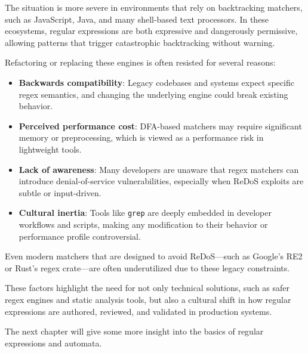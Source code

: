 The situation is more severe in environments that rely on backtracking matchers, such as JavaScript, Java, and many shell-based text processors. In these ecosystems, regular expressions are both expressive and dangerously permissive, allowing patterns that trigger catastrophic backtracking without warning.

Refactoring or replacing these engines is often resisted for several reasons:
\begin{itemize}
	\item \textbf{Backwards compatibility}: Legacy codebases and systems expect specific regex semantics, and changing the underlying engine could break existing behavior.
	\item \textbf{Perceived performance cost}: DFA-based matchers may require significant memory or preprocessing, which is viewed as a performance risk in lightweight tools.
	\item \textbf{Lack of awareness}: Many developers are unaware that regex matchers can introduce denial-of-service vulnerabilities, especially when ReDoS exploits are subtle or input-driven.
	\item \textbf{Cultural inertia}: Tools like \texttt{grep} are deeply embedded in developer workflows and scripts, making any modification to their behavior or performance profile controversial.
\end{itemize}

Even modern matchers that are designed to avoid ReDoS—such as Google’s RE2 or Rust’s regex crate—are often underutilized due to these legacy constraints.

These factors highlight the need for not only technical solutions, such as safer regex engines and static analysis tools, but also a cultural shift in how regular expressions are authored, reviewed, and validated in production systems.

The next chapter will give some more insight into the basics of regular expressions and automata.

%

